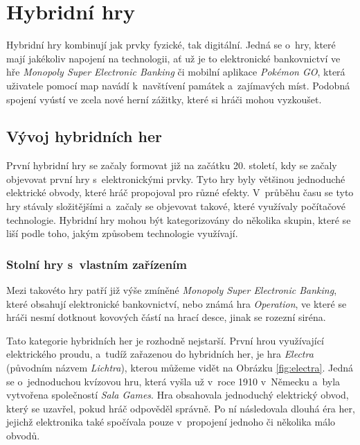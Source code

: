 \chapter{Hybridní hry}
Hybridní hry kombinují jak prvky fyzické, tak digitální. Jedná se o~hry, které mají jakékoliv napojení na technologii, ať už je to elektronické bankovnictví ve hře \textit{Monopoly Super Electronic Banking} či mobilní aplikace \textit{Pokémon GO}, která uživatele pomocí map navádí k~navštívení památek a~zajímavých míst. Podobná spojení vyústí ve zcela nové herní zážitky, které si hráči mohou vyzkoušet. \cite{hybrid_board_games_design}

\section{Vývoj hybridních her}
První hybridní hry se začaly formovat již na začátku 20. století, kdy se začaly objevovat první hry s~elektronickými prvky. Tyto hry byly většinou jednoduché elektrické obvody, které hráč propojoval pro různé efekty. V~průběhu času se tyto hry stávaly složitějšími a~začaly se objevovat takové, které využívaly počítačové technologie. Hybridní hry mohou být kategorizovány do několika skupin, které se liší podle toho, jakým způsobem technologie využívají. \cite{history_of_hybrid_games}

\subsection{Stolní hry s~vlastním zařízením}
Mezi takovéto hry patří již výše zmíněné \textit{Monopoly Super Electronic Banking}, které obsahují elektronické bankovnictví, nebo známá hra \textit{Operation}, ve které se hráči nesmí dotknout kovových částí na hrací desce, jinak se rozezní siréna. 

Tato kategorie hybridních her je rozhodně nejstarší. První hrou využívající elektrického proudu, a~tudíž zařazenou do hybridních her, je hra \textit{Electra} (původním názvem \textit{Lichtra}), kterou můžeme vidět na Obrázku \ref{fig:electra}. Jedná se o~jednoduchou kvízovou hru, která vyšla už v~roce 1910 v~Německu a~byla vytvořena společností \textit{Sala Games}. Hra obsahovala jednoduchý elektrický obvod, který se uzavřel, pokud hráč odpověděl správně. Po ní následovala dlouhá éra her, jejichž elektronika také spočívala pouze v~propojení jednoho či několika málo obvodů. \cite{history_of_hybrid_games, boardgames_with_apps}

